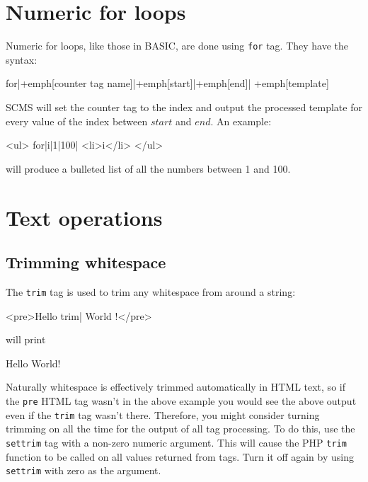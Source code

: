 \section{Numeric for loops}
Numeric for loops, like those in BASIC, are done using \texttt{for} tag. They have the syntax:
\begin{MyVerbatim}[commandchars=+\[\]]
{{for|+emph[counter tag name]|+emph[start]|+emph[end]|
    +emph[template]}}
\end{MyVerbatim}
SCMS will set the counter tag to the index and output the processed template for every value of the index
between $start$ and $end$. An example:
\begin{MyVerbatim}
<ul>
{{for|i|1|100|
    <li>{{i}}</li>}}
</ul>    
\end{MyVerbatim}
will produce a bulleted list of all the numbers between 1 and 100.

\section{Text operations}
\subsection{Trimming whitespace}
The \texttt{trim} tag is used to trim any whitespace from around a string:
\begin{MyVerbatim}
<pre>Hello {{trim|    World   }}!</pre>
\end{MyVerbatim}
will print
\begin{MyVerbatim}
Hello World!
\end{MyVerbatim}
Naturally whitespace is effectively trimmed automatically in HTML text,
so if the \texttt{pre} HTML tag wasn't in the above example you would
see the above output even if the \texttt{trim} tag wasn't there.
Therefore, you might consider turning trimming on all the time for 
the output of all tag processing. To do this, use the  \texttt{settrim}
tag with a non-zero numeric argument. This will cause the PHP \texttt{trim}
function to be called on all values returned from tags. Turn it off again
by using \texttt{settrim} with zero as the argument.

